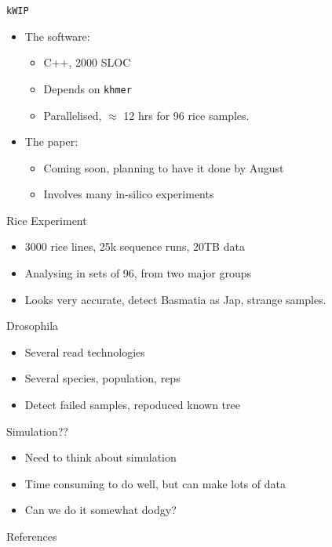 \documentclass[t]{beamer}
\begin{document}
\begin{frame}{\texttt{kWIP}}
  \begin{itemize}
    \item The software:
      \begin{itemize}
        \item C++, 2000 SLOC
        \item Depends on \texttt{khmer}
        \item Parallelised, $\approx$ 12 hrs for 96 rice samples.
      \end{itemize}
    \pause
    \item The paper:
      \begin{itemize}
        \item Coming soon, planning to have it done by August
        \item Involves many in-silico experiments
      \end{itemize}
  \end{itemize}
\end{frame}


\begin{frame}{Rice Experiment}
  \begin{itemize}
    \item 3000 rice lines, 25k sequence runs, 20TB data
    \item Analysing in sets of 96, from two major groups
    \item Looks very accurate, detect Basmatia as Jap, strange samples.
  \end{itemize}
\end{frame}

\begin{frame}{Drosophila}
  \begin{itemize}
    \item Several read technologies
    \item Several species, population, reps
    \item Detect failed samples, repoduced known tree
  \end{itemize}
\end{frame}

\begin{frame}{Simulation??}
  \begin{itemize}
    \item Need to think about simulation
    \item Time consuming to do well, but can make lots of data
    \item Can we do it somewhat dodgy?
  \end{itemize}
\end{frame}

\begin{frame}{References}
  \printbibliography
\end{frame}
\end{document}
